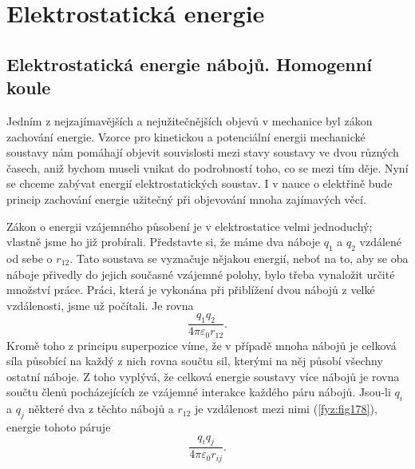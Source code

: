 \setchaptertoc
\chapter{Elektrostatická energie}\label{fyz:IIchapVI}
  \section{Elektrostatická energie nábojů. Homogenní koule}\label{fyz:IIchapVIsecI}
    Jedním z nejzajímavějších a nejužitečnějších objevů v mechanice byl zákon zachování energie.
    Vzorce pro kinetickou a potenciální energii mechanické soustavy nám pomáhají objevit souvislosti
    mezi stavy soustavy ve dvou různých časech, aniž bychom museli vnikat do podrobností toho, co se
    mezi tím děje. Nyní se chceme zabývat energií elektrostatických soustav. I v nauce o elektřině
    bude princip zachování energie užitečný při objevování mnoha zajímavých věcí.

    Zákon o energii vzájemného působení je v elektrostatice velmi jednoduchý; vlastně jsme ho již
    probírali. Představte si, že máme dva náboje \(q_1\) a \(q_2\) vzdálené od sebe o \(r_{12}\).
    Tato soustava se vyznačuje nějakou energií, neboť na to, aby se oba náboje přivedly do jejich
    současné vzájemné polohy, bylo třeba vynaložit určité množství práce. Práci, která je vykonána
    při přiblížení dvou nábojů z velké vzdálenosti, jsme už počítali. Je rovna
    \begin{equation}\label{fyz:eq868}
      \dfrac{q_1q_2}{4π\varepsilon_0r_{12}}.      
    \end{equation}
    Kromě toho z principu superpozice víme, že v případě mnoha nábojů je celková síla působící na
    každý z nich rovna součtu sil, kterými na něj působí všechny ostatní náboje. Z toho vyplývá, že
    celková energie soustavy více nábojů je rovna součtu členů pocházejících ze vzájemné interakce
    každého páru nábojů. Jsou-li \(q_i\) a \(q_j\) některé dva z těchto nábojů a \(r_{12}\) je
    vzdálenost mezi nimi (\ref{fyz:fig178}), energie tohoto páruje
    \begin{equation}\label{fyz:eq869}
      \dfrac{q_iq_j}{4π\varepsilon_0r_{ij}}.      
    \end{equation}

